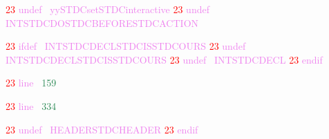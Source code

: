 \documentclass[8, usernames, dvipsnames]{beamer}
\begin{document}
\begin{frame}
 \textcolor{Red}{23}
\textcolor{Violet}{undef}\textcolor{White}{\ }
\textcolor{Violet}{yySTDCsetSTDCinteractive}
  \textcolor{Red}{23}
\textcolor{Violet}{undef}\textcolor{White}{\ }
\textcolor{Violet}{INTSTDCDOSTDCBEFORESTDCACTION}
 
  \textcolor{Red}{23}
\textcolor{Violet}{ifdef}\textcolor{White}{\ }
\textcolor{Violet}{INTSTDCDECLSTDCISSTDCOURS}
  \textcolor{Red}{23}
\textcolor{Violet}{undef}\textcolor{White}{\ }
\textcolor{Violet}{INTSTDCDECLSTDCISSTDCOURS}
  \textcolor{Red}{23}
\textcolor{Violet}{undef}\textcolor{White}{\ }
\textcolor{Violet}{INTSTDCDECL}
  \textcolor{Red}{23}
\textcolor{Violet}{endif}
 
  \textcolor{Red}{23}
\textcolor{Violet}{line}\textcolor{White}{\ }
\textcolor{SeaGreen}{159}
\textcolor{White}{\ }

 
 \end{frame}
\begin{frame}

  \textcolor{Red}{23}
\textcolor{Violet}{line}\textcolor{White}{\ }
\textcolor{SeaGreen}{334}
\textcolor{White}{\ }

  \textcolor{Red}{23}
\textcolor{Violet}{undef}\textcolor{White}{\ }
\textcolor{Violet}{HEADERSTDCHEADER}
  \textcolor{Red}{23}
\textcolor{Violet}{endif}\textcolor{White}{\ }

 \end{frame}
\begin{frame} 
\end{frame} 
\begin{frame} 
\end{frame} 
\end{document}
